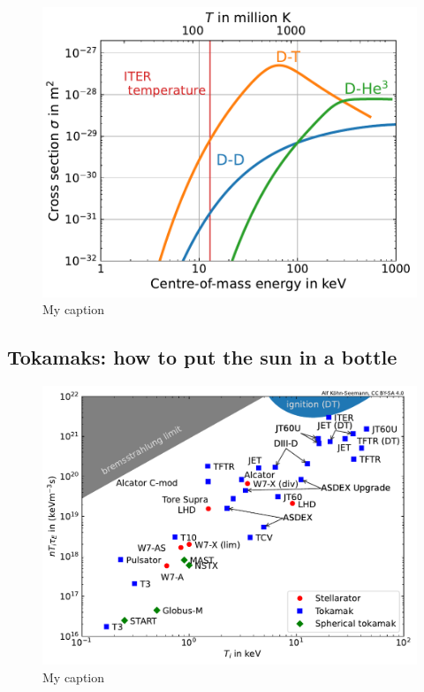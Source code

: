 \lipsum[6]
\lipsum[6]

\begin{figure} [h]
    \centering
    \includegraphics[width=\linewidth]{Figures/Chapter1/cross_sections_vs_temperature__Bosch.pdf}
    \caption{My caption}
\end{figure}


\subsection{Tokamaks: how to put the sun in a bottle}

\lipsum[6]
\lipsum[6]

\begin{figure}
    \centering
    \includegraphics[width=\linewidth]{Figures/Chapter1/triple_product_vs_T.pdf}
    \caption{My caption}
\end{figure}

